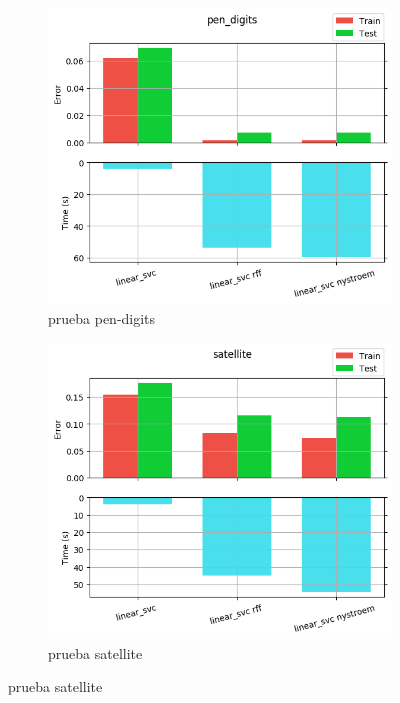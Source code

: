 \begin{figure}[ht]
  \centering
  \begin{subfigure}[b]{0.5\linewidth}
    \centering\includegraphics[width=\imgscale\linewidth]{Figures/2_5/pen_digits}
    \caption{prueba pen-digits}
    \label{fig:2_5_pen_digits}
  \end{subfigure}%
  \begin{subfigure}[b]{0.5\linewidth}
    \centering\includegraphics[width=\imgscale\linewidth]{Figures/2_5/satellite}
    \caption{prueba satellite}
    \label{fig:2_5_satellite}
  \end{subfigure}
\end{figure}

